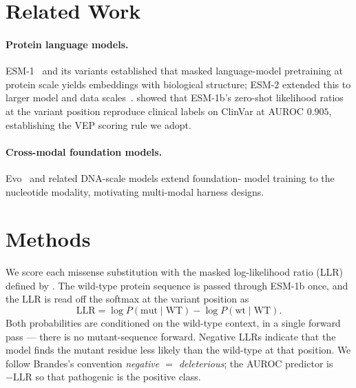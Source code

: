 \documentclass{article}
\begin{document}

\section{Related Work}
\label{sec:related-work}

\paragraph{Protein language models.}
ESM-1~\citep{rives2021esm} and its variants established that masked
language-model pretraining at protein scale yields embeddings with
biological structure; ESM-2 extended this to larger model and data
scales~\citep{lin2023esm}. \citet{brandes2023} showed that ESM-1b's
zero-shot likelihood ratios at the variant position reproduce clinical
labels on ClinVar at AUROC $0.905$, establishing the VEP scoring rule
we adopt.

\paragraph{Cross-modal foundation models.}
Evo~\citep{nguyen2024evo2} and related DNA-scale models extend foundation-
model training to the nucleotide modality, motivating multi-modal harness
designs.


\section{Methods}
\label{sec:methods}


We score each missense substitution with the masked log-likelihood ratio
(LLR) defined by \citet{brandes2023}. The wild-type protein sequence is
passed through ESM-1b once, and the LLR is read off the softmax at the
variant position as
\begin{equation}
  \mathrm{LLR} = \log P(\mathrm{mut} \mid \mathrm{WT}) -
                 \log P(\mathrm{wt}  \mid \mathrm{WT}).
  \label{eq:llr}
\end{equation}
Both probabilities are conditioned on the wild-type context, in a single
forward pass --- there is no mutant-sequence forward. Negative LLRs
indicate that the model finds the mutant residue less likely than the
wild-type at that position. We follow Brandes's convention
\emph{negative $=$ deleterious}; the AUROC predictor is $-\mathrm{LLR}$ so
that pathogenic is the positive class.
\end{document}
